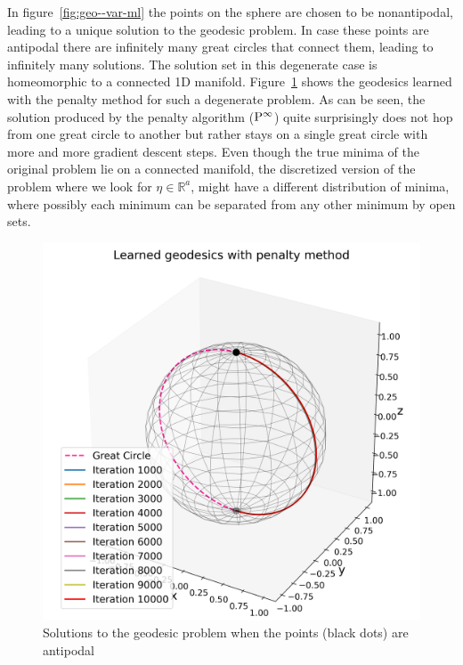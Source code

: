 In figure~\ref{fig:geo--var-ml} the points on the sphere are chosen to be nonantipodal, leading to a unique solution to the geodesic problem. In case these points are antipodal there are infinitely many great circles that connect them, leading to infinitely many solutions. The solution set in this degenerate case is homeomorphic to a connected 1D manifold. Figure~\ref{fig:geo-ap--var-ml} shows the geodesics learned with the penalty method for such a degenerate problem. As can be seen, the solution produced by the penalty algorithm (${\rm P}^\infty$) quite surprisingly does not hop from one great circle to another but rather stays on a single great circle with more and more gradient descent steps. Even though the true minima of the original problem lie on a connected manifold, the discretized version of the problem where we look for $\eta\in\mathbb R^a$, might have a different distribution of minima, where possibly each minimum can be separated from any other minimum by open sets.
\begin{figure}[!ht]
    \centering
\includegraphics[scale=0.4]{var-ml/plots/var-plots-sphere-geodesic-antipodal.png}
    \caption{Solutions to the geodesic problem when the points (black dots) are antipodal}
    \label{fig:geo-ap--var-ml}
\end{figure}
